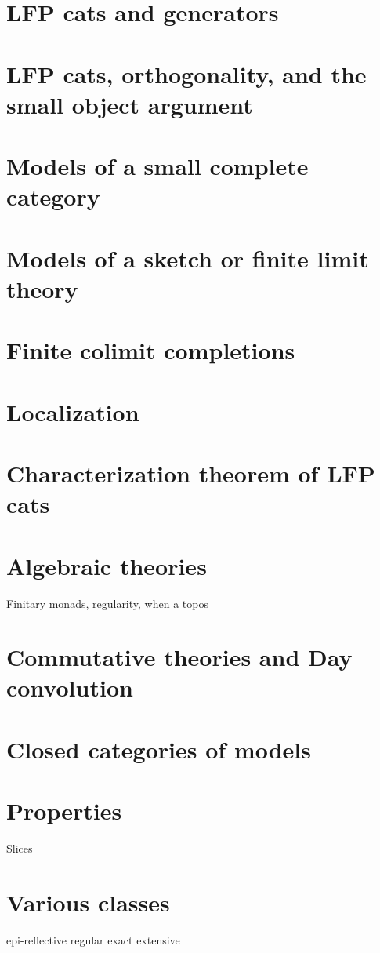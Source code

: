 \documentclass{article}
\newcommand{\<}{\left\langle}
\renewcommand{\>}{\right\rangle}
\begin{document}
\section{LFP cats and generators}

\section{LFP cats, orthogonality, and the small object argument}

\section{Models of a small complete category}

\section{Models of a sketch or finite limit theory}

\section{Finite colimit completions}

\section{Localization}

\section{Characterization theorem of LFP cats}

\section{Algebraic theories}
Finitary monads, regularity, when a topos

\section{Commutative theories and Day convolution}

\section{Closed categories of models}

\section{Properties}
Slices

\section{Various classes}
epi-reflective
regular
exact
extensive 
\end{document}
